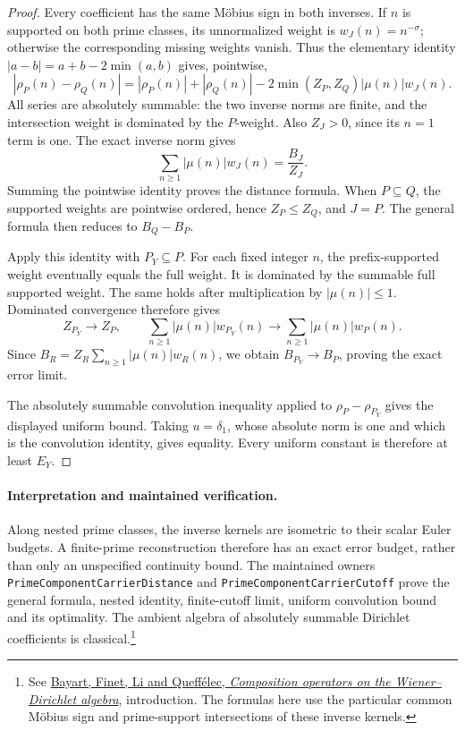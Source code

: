 \documentclass[11pt]{article}
\theoremstyle{definition}
\begin{document}
\begin{proof}
Every coefficient has the same M\"obius sign in both inverses.
If \(n\) is supported on both prime classes, its unnormalized
weight is \(w_J(n)=n^{-\sigma}\); otherwise the corresponding
missing weights vanish. Thus the elementary identity
\(|a-b|=a+b-2\min(a,b)\) gives, pointwise,
\[
 |\rho_P(n)-\rho_Q(n)|
  =|\rho_P(n)|+|\rho_Q(n)|
    -2\min(Z_P,Z_Q)|\mu(n)|w_J(n).
\]
All series are absolutely summable: the two inverse norms are
finite, and the intersection weight is dominated by the
\(P\)-weight. Also \(Z_J>0\), since its \(n=1\) term is one.
The exact inverse norm gives
\[
 \sum_{n\ge1}|\mu(n)|w_J(n)=\frac{B_J}{Z_J}.
\]
Summing the pointwise identity proves the distance formula.
When \(P\subseteq Q\), the supported weights are pointwise
ordered, hence \(Z_P\le Z_Q\), and \(J=P\).
The general formula then reduces to \(B_Q-B_P\).

Apply this identity with \(P_Y\subseteq P\).
For each fixed integer \(n\), the prefix-supported weight
eventually equals the full weight. It is dominated by the
summable full supported weight. The same holds after
multiplication by \(|\mu(n)|\le1\).
Dominated convergence therefore gives
\[
 Z_{P_Y}\longrightarrow Z_P,\qquad
 \sum_{n\ge1}|\mu(n)|w_{P_Y}(n)
   \longrightarrow\sum_{n\ge1}|\mu(n)|w_P(n).
\]
Since \(B_R=Z_R\sum_{n\ge1}|\mu(n)|w_R(n)\),
we obtain \(B_{P_Y}\to B_P\), proving the exact error limit.

The absolutely summable convolution inequality applied to
\(\rho_P-\rho_{P_Y}\) gives the displayed uniform bound.
Taking \(u=\delta_1\), whose absolute norm is one and which is
the convolution identity, gives equality. Every uniform
constant is therefore at least \(E_Y\).
\end{proof}

\paragraph{Interpretation and maintained verification.}
Along nested prime classes, the inverse kernels are isometric
to their scalar Euler budgets. A finite-prime reconstruction
therefore has an exact error budget, rather than only an
unspecified continuity bound. The maintained owners
\texttt{PrimeComponentCarrierDistance} and
\texttt{PrimeComponentCarrierCutoff} prove the general formula,
nested identity, finite-cutoff limit, uniform convolution
bound and its optimality. The ambient algebra of absolutely
summable Dirichlet coefficients is classical.\footnote{See
\href{https://arxiv.org/html/0904.2527v1}{Bayart, Finet, Li and
Queff\'elec, \emph{Composition operators on the Wiener--Dirichlet
algebra}}, introduction. The formulas here use the particular
common M\"obius sign and prime-support intersections of these
inverse kernels.}
\end{document}
